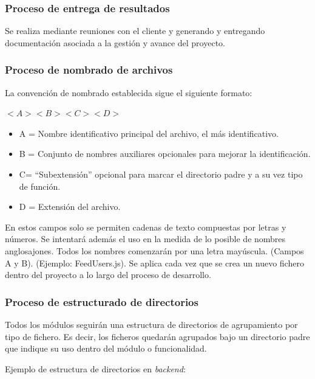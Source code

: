 \documentclass{article}
\begin{document}
\subsubsection{Proceso de entrega de resultados} \label{P.EC.7}
Se realiza mediante reuniones con el cliente y generando y entregando documentación asociada a la gestión y avance del proyecto.

\subsubsection{Proceso de nombrado de archivos} \label{P.EC.8}

La convención de nombrado establecida sigue el siguiente formato:

$<A><B><C><D>$

\begin{itemize}
   \setlength{\itemsep}{0em} %
   \item A = Nombre identificativo principal del archivo, el más identificativo.
   \item B = Conjunto de nombres auxiliares opcionales para mejorar la identificación.
   \item C= “Subextensión” opcional para marcar el directorio padre y a su vez tipo de función.
   \item D = Extensión del archivo.
\end{itemize}

En estos campos solo se permiten cadenas de texto compuestas por letras y números. Se intentará además el uso en la medida de lo posible de nombres anglosajones. Todos los nombres comenzarán por una letra mayúscula. (Campos A y B). (Ejemplo: FeedUsers.js). Se aplica cada vez que se crea un nuevo fichero dentro del proyecto a lo largo del proceso de desarrollo.

\subsubsection{Proceso de estructurado de directorios} \label{P.EC.9}

Todos los módulos seguirán una estructura de directorios de agrupamiento por tipo de fichero. Es decir, los ficheros quedarán agrupados bajo un directorio padre que indique su uso dentro del módulo o funcionalidad.

Ejemplo de estructura de directorios en \textit{backend}:

\end{document}
